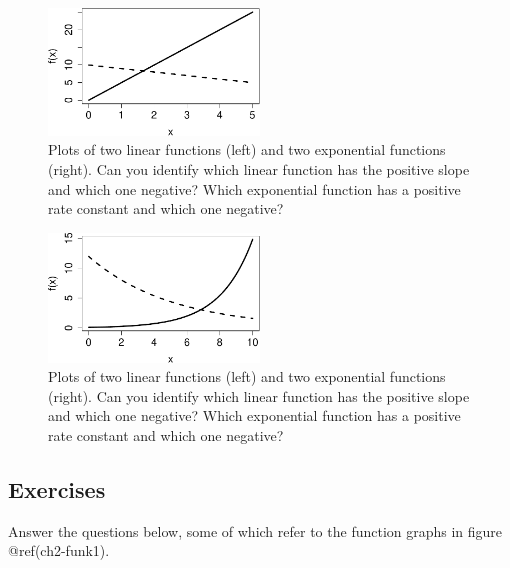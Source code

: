 \documentclass[
  letterpaper,
  DIV=11,
  numbers=noendperiod]{scrreprt}
\begin{document}
\begin{figure}

{\centering \includegraphics[width=0.5\textwidth,height=\textheight]{./functions_files/figure-pdf/ch2-funk1-1.pdf}

}

\caption{Plots of two linear functions (left) and two exponential
functions (right). Can you identify which linear function has the
positive slope and which one negative? Which exponential function has a
positive rate constant and which one negative?}

\end{figure}

\begin{figure}

{\centering \includegraphics[width=0.5\textwidth,height=\textheight]{./functions_files/figure-pdf/ch2-funk1-2.pdf}

}

\caption{Plots of two linear functions (left) and two exponential
functions (right). Can you identify which linear function has the
positive slope and which one negative? Which exponential function has a
positive rate constant and which one negative?}

\end{figure}

\hypertarget{exercises-2}{%
\subsection{Exercises}\label{exercises-2}}

Answer the questions below, some of which refer to the function graphs
in figure @ref(ch2-funk1).
\end{document}

